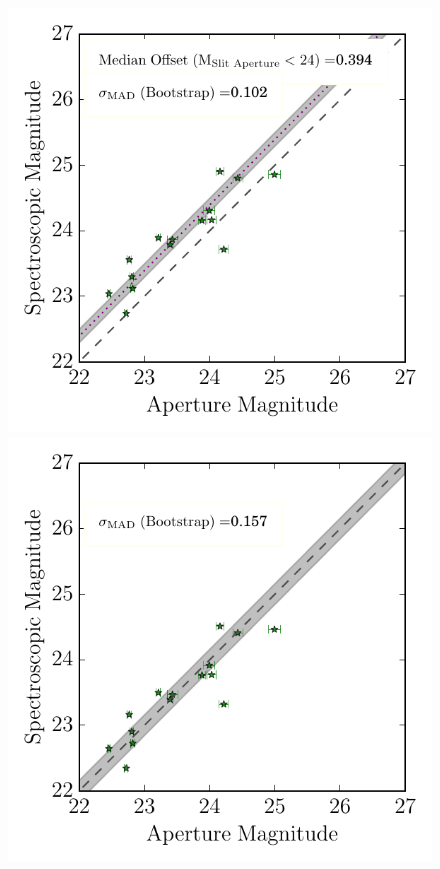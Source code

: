 \documentclass[iop]{emulateapj}
\begin{document}
\begin{figure}
\includegraphics[scale=0.9]{figures/magcomp_KL3_bs_comp.pdf}
\includegraphics[scale=0.9]{figures/magcomp_KL3_as_comp.pdf}

\end{figure}
\end{document}
